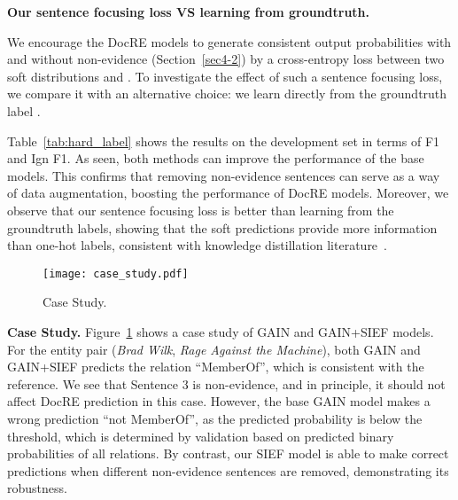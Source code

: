 \documentclass[11pt]{article}
\begin{document}
\textbf{Our sentence focusing loss VS learning from groundtruth.}
\begin{table}[!t]
\centering
{}
\caption{Comparing our sentence focusing loss with learning from groundtruth labels (denoted by GTruth).}
\label{tab:hard_label}
\end{table}
We encourage the DocRE models to generate consistent output probabilities with and without non-evidence (Section~\ref{sec4-2}) by a cross-entropy loss between two soft distributions  and .
To investigate the effect of such a sentence focusing loss, we compare it with an alternative choice: we learn  directly from the groundtruth label .


Table~\ref{tab:hard_label} shows the results on the development set in terms of F1 and Ign F1.
As seen, both methods can improve the performance of the base models. This confirms that removing non-evidence sentences can serve as a way of data augmentation, boosting the performance of DocRE models.
Moreover, we observe that our sentence focusing loss is better than learning from the groundtruth labels, showing that the soft predictions provide more information than one-hot labels, consistent with knowledge distillation literature~\cite{kd44873}. 

\begin{figure}[!t]
  \centering
  \texttt{[image: case\_study.pdf]}
  \caption{Case Study.}
  \label{fig:casestudy}
\end{figure}

\textbf{Case Study.}
Figure~\ref{fig:casestudy} shows a case study of GAIN and GAIN+SIEF models. 
For the entity pair (\textit{Brad Wilk}, \textit{Rage Against the Machine}), both GAIN and GAIN+SIEF predicts the relation ``MemberOf'', which is consistent with the reference.
We see that Sentence 3 is non-evidence, and in principle, it should not affect DocRE prediction in this case. However, the base GAIN model makes a wrong prediction ``not MemberOf'', as the predicted probability is below the threshold, which is determined by validation based on predicted binary probabilities of all relations. By contrast, our SIEF model is able to make correct predictions when different non-evidence sentences are removed, demonstrating its robustness.
\end{document}
